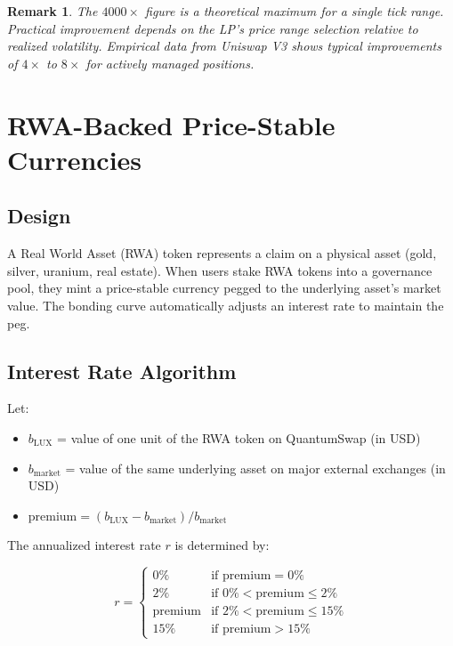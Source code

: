 \documentclass[11pt,a4paper]{article}
\newtheorem{remark}{Remark}[section]
\begin{document}
\begin{remark}
The $4000\times$ figure is a theoretical maximum for a single tick
range. Practical improvement depends on the LP's price range selection
relative to realized volatility. Empirical data from Uniswap V3
shows typical improvements of $4\times$ to $8\times$ for actively
managed positions.
\end{remark}

\section{RWA-Backed Price-Stable Currencies}

\subsection{Design}

A Real World Asset (RWA) token represents a claim on a physical
asset (gold, silver, uranium, real estate). When users stake RWA tokens
into a governance pool, they mint a price-stable currency pegged to
the underlying asset's market value. The bonding curve automatically
adjusts an interest rate to maintain the peg.

\subsection{Interest Rate Algorithm}\label{sec:interest}

Let:
\begin{itemize}[nosep]
  \item $b_{\text{LUX}}$ = value of one unit of the RWA token on
        QuantumSwap (in USD)
  \item $b_{\text{market}}$ = value of the same underlying asset on
        major external exchanges (in USD)
  \item $\text{premium} = (b_{\text{LUX}} - b_{\text{market}}) /
        b_{\text{market}}$
\end{itemize}

The annualized interest rate $r$ is determined by:

\begin{equation}\label{eq:interest-rate}
r = \begin{cases}
  0\%   & \text{if } \text{premium} = 0\% \\
  2\%   & \text{if } 0\% < \text{premium} \leq 2\% \\
  \text{premium} & \text{if } 2\% < \text{premium} \leq 15\% \\
  15\%  & \text{if } \text{premium} > 15\%
\end{cases}
\end{equation}
\end{document}
